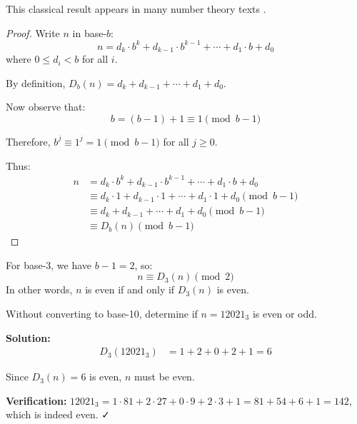 This classical result appears in many number theory texts \cite{hardy1979,apostol1976}.

\begin{proof}
Write $n$ in base-$b$:
\begin{equation}
n = d_k \cdot b^k + d_{k-1} \cdot b^{k-1} + \cdots + d_1 \cdot b + d_0
\end{equation}
where $0 \leq d_i < b$ for all $i$.

By definition, $D_b(n) = d_k + d_{k-1} + \cdots + d_1 + d_0$.

Now observe that:
\begin{equation}
b = (b-1) + 1 \equiv 1 \pmod{b-1}
\end{equation}

Therefore, $b^j \equiv 1^j = 1 \pmod{b-1}$ for all $j \geq 0$.

Thus:
\begin{align}
n &= d_k \cdot b^k + d_{k-1} \cdot b^{k-1} + \cdots + d_1 \cdot b + d_0 \\
&\equiv d_k \cdot 1 + d_{k-1} \cdot 1 + \cdots + d_1 \cdot 1 + d_0 \pmod{b-1} \\
&\equiv d_k + d_{k-1} + \cdots + d_1 + d_0 \pmod{b-1} \\
&\equiv D_b(n) \pmod{b-1}
\end{align}
\end{proof}

\begin{theorem}
\label{thm:parity-rule}
\label{cor:base3-parity}
For base-3, we have $b-1 = 2$, so:
\begin{equation}
n \equiv D_3(n) \pmod{2}
\end{equation}
In other words, $n$ is even if and only if $D_3(n)$ is even.
\end{theorem}

\begin{example}
Without converting to base-10, determine if $n = 12021_3$ is even or odd.

\textbf{Solution:}
\begin{align}
D_3(12021_3) &= 1 + 2 + 0 + 2 + 1 = 6
\end{align}

Since $D_3(n) = 6$ is even, $n$ must be even.

\textbf{Verification:} $12021_3 = 1 \cdot 81 + 2 \cdot 27 + 0 \cdot 9 + 2 \cdot 3 + 1 = 81 + 54 + 6 + 1 = 142$, which is indeed even. ✓
\end{example}

